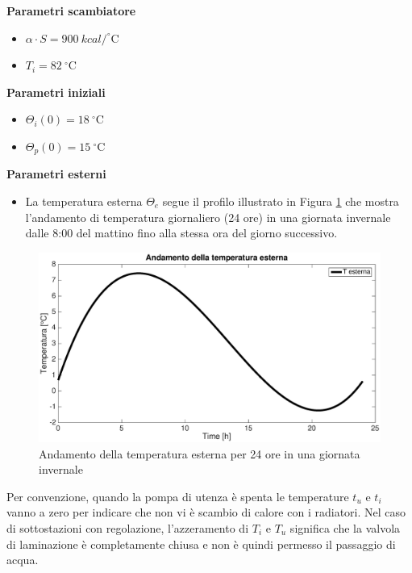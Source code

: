 \documentclass[laurea,oneside,11pt]{USiena_tesiLM3}
\begin{document}
\textbf{Parametri scambiatore}
\begin{itemize}
\item[]$\alpha \cdot S = 900 \ kcal / ^{\circ}$C
\item[]$T_i = 82 \ ^{\circ}$C
\end{itemize}

\textbf{Parametri iniziali}
\begin{itemize}
\item[]$\Theta_i(0) = 18 \ ^{\circ}$C
\item[]$\Theta_p(0) = 15 \ ^{\circ}$C
\end{itemize}

\textbf{Parametri esterni}
\begin{itemize}
\item[] La temperatura esterna $\Theta_e$ segue il profilo illustrato in Figura \ref{fig:temp_est} che mostra l'andamento di temperatura giornaliero (24 ore) in una giornata invernale dalle 8:00 del mattino fino alla stessa ora del giorno successivo. 
\end{itemize}


\begin{figure}[!h]
\centering
\includegraphics[width=\textwidth]{figure/temp_est} 
\caption{Andamento della temperatura esterna per 24 ore in una giornata invernale}
\label{fig:temp_est}
\end{figure}

Per convenzione, quando la pompa di utenza è spenta le temperature $t_u$ e $t_i$ vanno a zero per indicare che non vi è scambio di calore con i radiatori. Nel caso di sottostazioni con regolazione, l'azzeramento di $T_i$ e $T_u$ significa che la valvola di laminazione è completamente chiusa e non è quindi permesso il passaggio di acqua. 

\end{document}
